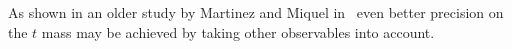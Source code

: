 



As shown in an older study by Martinez and Miquel in~\cite{Martinez:2002st} even better precision on the $t$ mass may be achieved by taking 
other observables into account.


 

